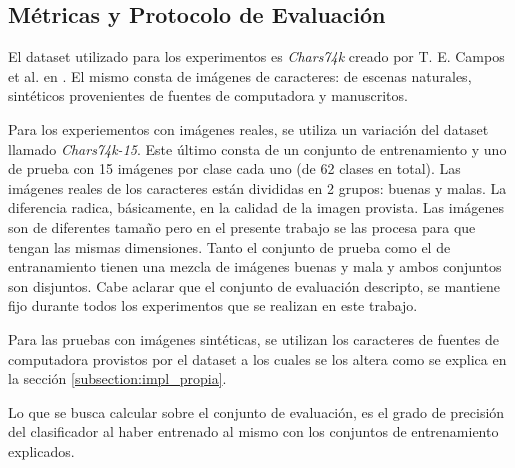 \subsection{Métricas y Protocolo de Evaluación}
\label{subsection:evaluacion}


	El dataset utilizado para los experimentos es \textit{Chars74k} creado por T. E. Campos et al. en \cite{dCBV09}. El mismo consta de imágenes de caracteres: de escenas naturales, sintéticos provenientes de fuentes de computadora y manuscritos.
	
	Para los experiementos con imágenes reales, se utiliza un variación del dataset llamado \textit{Chars74k-15}. Este último consta de un conjunto de entrenamiento y uno de prueba con 15 imágenes por clase cada uno (de 62 clases en total). Las imágenes reales de los caracteres están divididas en 2 grupos: buenas y malas. La diferencia radica, básicamente, en la calidad de la imagen provista. Las imágenes son de diferentes tamaño pero en el presente trabajo se las procesa para que tengan las mismas dimensiones. Tanto el conjunto de prueba como el de entranamiento tienen una mezcla de imágenes buenas y mala y ambos conjuntos son disjuntos. Cabe aclarar que el conjunto de evaluación descripto, se mantiene fijo durante todos los experimentos que se realizan en este trabajo.
	
	Para las pruebas con imágenes sintéticas, se utilizan los caracteres de fuentes de computadora provistos por el dataset a los cuales se los altera como se explica en la sección \ref{subsection:impl_propia}.
	
	Lo que se busca calcular sobre el conjunto de evaluación, es el grado de precisión del clasificador al haber entrenado al mismo con los conjuntos de entrenamiento explicados.